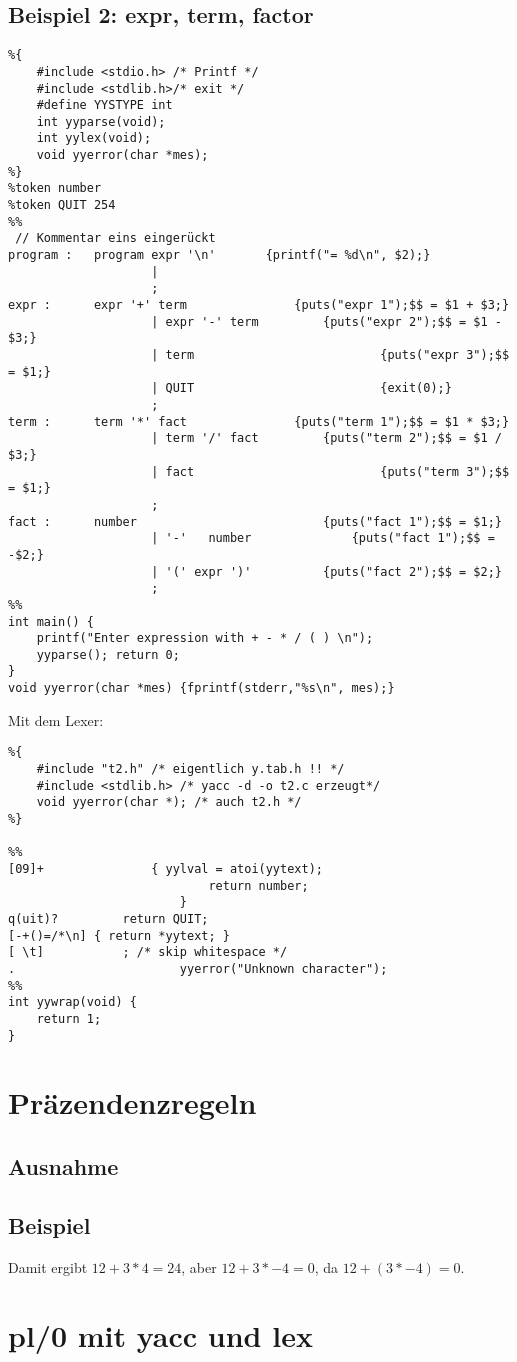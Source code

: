\subsection{Beispiel 2: expr, term, factor}
\begin{lstlisting}
%{
	#include <stdio.h> /* Printf */
	#include <stdlib.h>/* exit */
	#define YYSTYPE int
	int yyparse(void);
	int yylex(void);
	void yyerror(char *mes);
%}
%token number
%token QUIT 254
%%
 // Kommentar eins eingerückt
program :	program expr '\n'		{printf("= %d\n", $2);}
					|
					;
expr : 		expr '+' term				{puts("expr 1");$$ = $1 + $3;}
					| expr '-' term			{puts("expr 2");$$ = $1 - $3;}
					| term							{puts("expr 3");$$ = $1;}
					| QUIT							{exit(0);}
					;
term : 		term '*' fact				{puts("term 1");$$ = $1 * $3;}
					| term '/' fact			{puts("term 2");$$ = $1 / $3;}
					| fact							{puts("term 3");$$ = $1;}
					;
fact : 		number							{puts("fact 1");$$ = $1;}
					| '-'	number				{puts("fact 1");$$ = -$2;}
					| '(' expr ')'			{puts("fact 2");$$ = $2;}
					;
%%
int main() {
	printf("Enter expression with + - * / ( ) \n");
	yyparse(); return 0;
}
void yyerror(char *mes) {fprintf(stderr,"%s\n", mes);}
\end{lstlisting}
Mit dem Lexer:
\begin{lstlisting}
%{
	#include "t2.h" /* eigentlich y.tab.h !! */
	#include <stdlib.h> /* yacc -d -o t2.c erzeugt*/
	void yyerror(char *); /* auch t2.h */
%}

%%
[09]+				{ yylval = atoi(yytext);
							return number;
						}
q(uit)? 		return QUIT;
[-+()=/*\n]	{ return *yytext; }
[ \t] 			; /* skip whitespace */
.						yyerror("Unknown character");
%%
int yywrap(void) {
	return 1;
}
\end{lstlisting}

\section{Präzendenzregeln}
\subsection{Ausnahme}
\subsection{Beispiel}
Damit ergibt $12+3*4=24$, aber $12+3*-4=0$, da $12+(3*-4)=0$.

\section{pl/0 mit yacc und lex}

